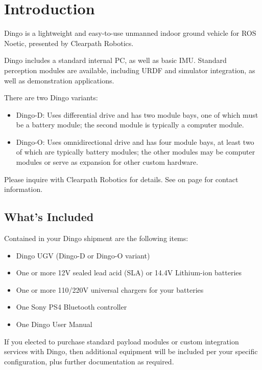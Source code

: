 \documentclass[]{clearpath-latex/clearpath-manual}
\begin{document}
\tableofcontents

\section{Introduction}

Dingo is a lightweight and easy-to-use unmanned indoor ground vehicle for ROS
Noetic, presented by Clearpath Robotics.

Dingo includes a standard internal PC, as well as basic IMU. Standard
perception modules are available, including URDF and simulator integration, as well as demonstration applications.

There are two Dingo variants:
\begin{itemize}[nolistsep]
	\item Dingo-D: Uses differential drive and has two module bays, one of which must be a battery module; the second module is typically a computer module.
	\item Dingo-O: Uses omnidirectional drive and has four module bays, at least two of which are typically battery modules; the other modules may be computer modules or serve as expansion for other custom hardware.
\end{itemize}

Please inquire with Clearpath Robotics for details. See  on page
\pageref{contact} for contact information.

\subsection{What's Included}

Contained in your Dingo shipment are the following items:

\begin{itemize}[nolistsep]
  \item Dingo UGV (Dingo-D or Dingo-O variant)
  \item One or more 12V sealed lead acid (SLA) or 14.4V Lithium-ion batteries
  \item One or more 110/220V universal chargers for your batteries
  \item One Sony PS4 Bluetooth controller
  \item One Dingo User Manual
\end{itemize}

If you elected to purchase standard payload modules or custom integration services with
Dingo, then additional equipment will be included per your specific configuration, plus
further documentation as required.
\end{document}
